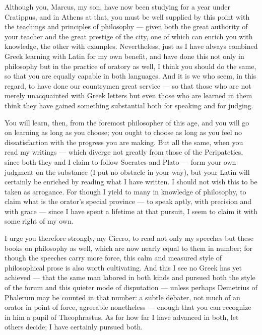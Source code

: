 

 Although you, Marcus, my son, have now been studying for a year under Cratippus, and in Athens at that, you must be well supplied by this point with the teachings and principles of philosophy — given both the great authority of your teacher and the great prestige of the city, one of which can enrich you with knowledge, the other with examples. Nevertheless, just as I have always combined Greek learning with Latin for my own benefit, and have done this not only in philosophy but in the practice of oratory as well, I think you should do the same, so that you are equally capable in both languages. And it is we who seem, in this regard, to have done our countrymen great service — so that those who are not merely unacquainted with Greek letters but even those who are learned in them think they have gained something substantial both for speaking and for judging.

 You will learn, then, from the foremost philosopher of this age, and you will go on learning as long as you choose; you ought to choose as long as you feel no dissatisfaction with the progress you are making. But all the same, when you read my writings — which diverge not greatly from those of the Peripatetics, since both they and I claim to follow Socrates and Plato — form your own judgment on the substance (I put no obstacle in your way), but your Latin will certainly be enriched by reading what I have written. I should not wish this to be taken as arrogance. For though I yield to many in knowledge of philosophy, to claim what is the orator's special province — to speak aptly, with precision and with grace — since I have spent a lifetime at that pursuit, I seem to claim it with some right of my own.

 I urge you therefore strongly, my Cicero, to read not only my speeches but these books on philosophy as well, which are now nearly equal to them in number; for though the speeches carry more force, this calm and measured style of philosophical prose is also worth cultivating. And this I see no Greek has yet achieved — that the same man labored in both kinds and pursued both the style of the forum and this quieter mode of disputation — unless perhaps Demetrius of Phalerum may be counted in that number: a subtle debater, not much of an orator in point of force, agreeable nonetheless — enough that you can recognize in him a pupil of Theophrastus. As for how far I have advanced in both, let others decide; I have certainly pursued both.


